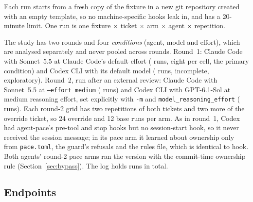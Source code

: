 \documentclass[11pt]{article}
\newcommand{\pace}{\textsf{agent-pace}}
\newcommand{\arm}[1]{\textsf{#1}}
\begin{document}
Each run starts from a fresh copy of the fixture in a new git repository created with an empty template, so no machine-specific hooks leak in, and has a 20-minute limit. One run is one fixture $\times$ ticket $\times$ arm $\times$ agent $\times$ repetition.

The study has two rounds and four \emph{conditions} (agent, model and effort), which are analysed separately and never pooled across rounds. Round~1: Claude Code with Sonnet~5.5 at Claude Code's default effort (\RRunsClaude{} runs, eight per cell, the primary condition) and Codex CLI with its default model (\RRunsCodex{} runs, incomplete, exploratory). Round~2, run after an external review: Claude Code with Sonnet~5.5 at \texttt{--effort medium} (\RRunsClaudeMed{} runs) and Codex CLI with GPT-6.1-Sol at medium reasoning effort, set explicitly with \texttt{-m} and \texttt{model\_reasoning\_effort} (\RRunsCodexMed{} runs). Each round-2 grid has two repetitions of both tickets and two more of the override ticket, so 24 override and 12 base runs per arm. As in round~1, Codex had \pace{}'s pre-tool and stop hooks but no session-start hook, so it never received the session message; in its \arm{pace} arm it learned about ownership only from \texttt{pace.toml}, the guard's refusals and the rules file, which is identical to \arm{hook}. Both agents' round-2 \arm{pace} arms ran the version with the commit-time ownership rule (Section~\ref{sec:bypass}). The log holds \RRuns{} runs in total.

\subsection{Endpoints}
\end{document}
